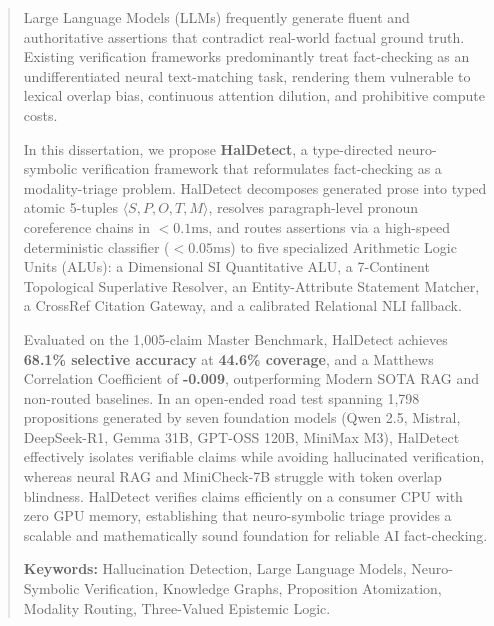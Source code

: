 \begin{abstract}
Large Language Models (LLMs) frequently generate fluent and authoritative assertions that contradict real-world factual ground truth. Existing verification frameworks predominantly treat fact-checking as an undifferentiated neural text-matching task, rendering them vulnerable to lexical overlap bias, continuous attention dilution, and prohibitive compute costs. 

In this dissertation, we propose \textbf{HalDetect}, a type-directed neuro-symbolic verification framework that reformulates fact-checking as a modality-triage problem. HalDetect decomposes generated prose into typed atomic 5-tuples $\langle S, P, O, T, M \rangle$, resolves paragraph-level pronoun coreference chains in $< 0.1\text{ms}$, and routes assertions via a high-speed deterministic classifier ($< 0.05\text{ms}$) to five specialized Arithmetic Logic Units (ALUs): a Dimensional SI Quantitative ALU, a 7-Continent Topological Superlative Resolver, an Entity-Attribute Statement Matcher, a CrossRef Citation Gateway, and a calibrated Relational NLI fallback.

Evaluated on the 1,005-claim Master Benchmark, HalDetect achieves \textbf{68.1\% selective accuracy} at \textbf{44.6\% coverage}, and a Matthews Correlation Coefficient of \textbf{-0.009}, outperforming Modern SOTA RAG and non-routed baselines. In an open-ended road test spanning 1,798 propositions generated by seven foundation models (Qwen 2.5, Mistral, DeepSeek-R1, Gemma 31B, GPT-OSS 120B, MiniMax M3), HalDetect effectively isolates verifiable claims while avoiding hallucinated verification, whereas neural RAG and MiniCheck-7B struggle with token overlap blindness. HalDetect verifies claims efficiently on a consumer CPU with zero GPU memory, establishing that neuro-symbolic triage provides a scalable and mathematically sound foundation for reliable AI fact-checking.

\vspace{1.5em}
\noindent\textbf{Keywords:} Hallucination Detection, Large Language Models, Neuro-Symbolic Verification, Knowledge Graphs, Proposition Atomization, Modality Routing, Three-Valued Epistemic Logic.
\end{abstract}
